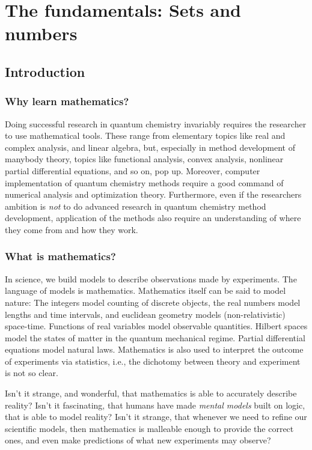 \chapter{The fundamentals: Sets and numbers}


\section{Introduction}

\subsection{Why learn mathematics?}

Doing successful research in quantum chemistry invariably requires the researcher to use mathematical tools. These range from elementary topics like real and complex analysis, and linear algebra, but, especially in method development of manybody theory, topics like functional analysis, convex analysis, nonlinear partial differential equations, and so on, pop up. Moreover, computer implementation of quantum chemistry methods require a good command of numerical analysis and optimization theory. Furthermore, even if the researchers ambition is \emph{not} to do advanced research in quantum chemistry method development, application of the methods also require an understanding of where they come from and how they work.


\subsection{What is mathematics?}

In science, we build models to describe observations made by experiments. The language of models is mathematics. Mathematics itself can be said to model nature: The integers model counting of discrete objects, the real numbers model lengths and time intervals, and euclidean geometry models (non-relativistic) space-time. Functions of real variables model observable quantities. Hilbert spaces model the states of matter in the quantum mechanical regime. Partial differential equations model natural laws. Mathematics is also used to interpret the outcome of experiments via statistics, i.e., the dichotomy between theory and experiment is not so clear.


Isn't it strange, and wonderful, that mathematics is able to accurately describe reality? Isn't it fascinating, that humans have made \emph{mental models} built on logic, that is able to model reality? Isn't it strange, that whenever we need to refine our scientific models, then mathematics is malleable enough to provide the correct ones, and even make predictions of what new experiments may observe?


